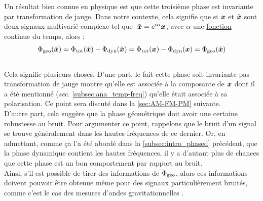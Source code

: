 Un résultat bien connue en physique \cite{bohm_geometric_2003,mukunda_quantum_1993,nakahara_geometry_2003} est que cette troisième phase est invariante par transformation de jauge. Dans notre contexte, cela signifie que si $\boldsymbol{x}$ et $\Tilde{\boldsymbol{x}}$ sont deux signaux multivarié complexe tel que $\ \Tilde{\boldsymbol{x}} = e^{i\alpha}\boldsymbol{x}$, avec $\alpha$ une \underline{fonction} continue du temps, alors :
\begin{align*}
	\Phi_{\text{\normalfont geo}}(\Tilde{\boldsymbol{x}}) &= \Phi_{\text{\normalfont tot}}(\Tilde{\boldsymbol{x}}) - \Phi_{\text{\normalfont dyn}}(\Tilde{\boldsymbol{x}})  = \Phi_{\text{\normalfont tot}}(\boldsymbol{x}) - \Phi_{\text{\normalfont dyn}}(\boldsymbol{x}) = \Phi_{\text{\normalfont geo}}(\Tilde{\boldsymbol{x}})\\
\end{align*}
\\
Cela signifie plusieurs choses. 
D'une part, le fait cette phase soit invariante pas transformation de jauge montre qu'elle est associée à la composante de $\boldsymbol{x}$ dont il a été mentionné (\textit{sec.} \ref{subsec:ana_temp-freq}) qu'elle était associée à sa polarisation. 
Ce point sera discuté dans la \cref{sec:AM-FM-PM} suivante.
 \\
D'autre part, cela suggère que la phase géométrique doit avoir une certaine robustesse au bruit.  Pour argumenter ce point, rappelons que le bruit d'un signal se trouve généralement dans les hautes fréquences de ce dernier.
Or, en admettant, comme ça l'a été abordé dans la \cref{subsec:intro_phased} précédent, que la phase dynamique contient les hautes fréquences, il y a d'autant plus de chances que cette phase est un bon comportement par rapport au bruit.
\\
Ainsi, s'il est possible de tirer des informations de $\Phi_{\text{\normalfont geo}}$, alors ces informations doivent pouvoir être obtenue même pour des signaux particulièrement bruités, comme c'est le cas des mesures d'ondes gravitationnelles .
\\


